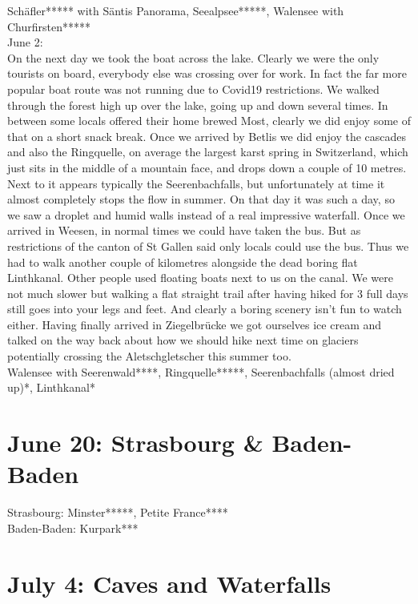 Sch\"afler***** with S\"antis Panorama, Seealpsee*****, Walensee with Churfirsten*****\\

June 2:\\
On the next day we took the boat across the lake. Clearly we were the only tourists on board, everybody else was crossing over for work. In fact the far more popular boat route was not running due to Covid19 restrictions. We walked through the forest high up over the lake, going up and down several times. In between some locals offered their home brewed Most, clearly we did enjoy some of that on a short snack break. Once we arrived by Betlis we did enjoy the cascades and also the Ringquelle, on average the largest karst spring in Switzerland, which just sits in the middle of a mountain face, and drops down a couple of 10 metres. Next to it appears typically the Seerenbachfalls, but unfortunately at time it almost completely stops the flow in summer. On that day it was such a day, so we saw a droplet and humid walls instead of a real impressive waterfall. Once we arrived in Weesen, in normal times we could have taken the bus. But as restrictions of the canton of St Gallen said only locals could use the bus. Thus we had to walk another couple of kilometres alongside the dead boring flat Linthkanal. Other people used floating boats next to us on the canal. We were not much slower but walking a flat straight trail after having hiked for 3 full days still goes into your legs and feet. And clearly a boring scenery isn't fun to watch either. Having finally arrived in Ziegelbr\"ucke we got ourselves ice cream and talked on the way back about how we should hike next time on glaciers potentially crossing the Aletschgletscher this summer too.\\

Walensee with Seerenwald****, Ringquelle*****, Seerenbachfalls (almost dried up)*, Linthkanal*\\

 \section{June 20: Strasbourg \& Baden-Baden}
\label{2020:Strasbourg}

Strasbourg: Minster*****, Petite France****\\
Baden-Baden: Kurpark***\\

 \section{July 4: Caves and Waterfalls}
\label{2020:CavesWaterfalls}

